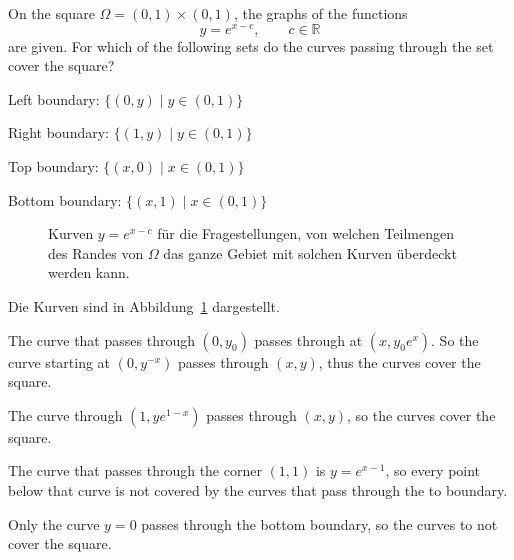 On the square $\Omega = (0,1)\times (0,1)$, the graphs of the functions
\[
y = e^{x-c},\qquad c \in\mathbb{R}
\]
are given.
For which of the following sets do the curves passing through the set
cover the square?
\begin{teilaufgaben}
\item Left boundary: $\{(0,y)\mid y\in (0,1)\}$
\item Right boundary: $\{(1,y)\mid y\in (0,1)\}$
\item Top boundary: $\{(x,0)\mid x\in (0,1)\}$
\item Bottom boundary: $\{(x,1)\mid x\in (0,1)\}$
\end{teilaufgaben}

\begin{loesung}
\begin{figure}
\centering
{}
\caption{Kurven $y=e^{x-c}$ für die Fragestellungen, von welchen Teilmengen
des Randes von $\Omega$ das ganze Gebiet mit solchen Kurven überdeckt
werden kann.
\label{30000031:fig}}
\end{figure}
Die Kurven sind in Abbildung~\ref{30000031:fig} dargestellt.
\begin{teilaufgaben}
\item
The curve that passes through $(0,y_0)$ passes through
at $(x,y_0e^x)$.
So the curve starting at $(0,y^{-x})$ passes through $(x,y)$, thus
the curves cover the square.
\item
The curve through $(1,ye^{1-x})$ passes through $(x,y)$, so the curves
cover the square.
\item
The curve that passes through the corner $(1,1)$ is $y=e^{x-1}$, so
every point below that curve is not covered by the curves that pass
through the to boundary.
\item
Only the curve $y=0$ passes through the bottom boundary, so the curves
to not cover the square.
\end{teilaufgaben}
\end{loesung}
